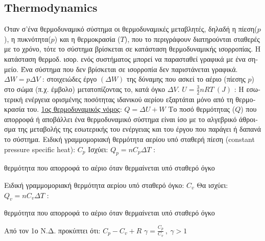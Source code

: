 \documentclass[12pt]{article}
\begin{document}
\begin{flushleft}
	\subsection{Thermodynamics} 
	
	\textbullet \quad \textgreek{Όταν σ'ένα θερμοδυναμικό σύστημα οι θερμοδυναμικές μεταβλητές, δηλαδή η πίεση}($p$), \textgreek{η πυκνότητα}($p$) \textgreek{και η θερμοκρασία} ($T$), \textgreek{που το περιγράφουν διατηρούνται σταθερές με το χρόνο, τότε το σύστημα βρίσκεται σε κατάσταση θερμοδυναμικής ισορροπίας. Η κατάσταση θερμοδ. ισορ. ενός συστήματος μπορεί να παρασταθεί γραφικά με ένα σημείο. Ένα σύστημα που δεν βρίσκεται σε ισορροπία δεν παριστάνεται γραφικά}. \linebreak 
	\textbullet \quad $\displaystyle \Delta W = p \Delta V$  :  \textgreek{στοιχειώδες έργο} $(\Delta W)$ \textgreek{της δύναμης που ασκεί το αέριο (πίεσης} $p$) \textgreek{στο σώμα (π.χ. έμβολο) μετατοπίζοντας το, κατά όγκο} $\Delta V$. \linebreak 
	\textbullet \quad $U = \frac{3}{2} nRT \ (J)$  :  \textgreek{Η εσωτερική ενέργεια ορισμένης ποσότητας ιδανικού αερίου εξαρτάται μόνο από τη θερμοκρασία του}. \linebreak 
	\textbullet \quad \uline{\textgreek{1ος θερμοδυναμικός νόμος}}: $\displaystyle Q = \Delta U + W$ \linebreak 
	\textgreek{Το ποσό θερμότητας} ($Q$) \textgreek{που απορροφά ή αποβάλλει ένα θερμοδυναμικό σύστημα είναι ίσο με το αλγεβρικό άθροισμα της μεταβολής της εσωτερικής του ενέργειας και του έργου που παράγει ή δαπανά το σύστημα}. \linebreak 
	\textbullet \quad \textgreek{Ειδική γραμμομοριακή θερμότητα αερίου υπό σταθερή πίεση} (constant pressure specific heat): $C_p$ \linebreak 
	\textgreek{Ισχύει:} $\displaystyle Q_p = n C_p \Delta T$  :  
	\begin{small}
	\textgreek{θερμότητα που απορροφά το αέριο όταν θερμαίνεται υπό σταθερό όγκο}
	\end{small} \linebreak 
	\textbullet \quad \textgreek{Ειδική γραμμομοριακή θερμότητα αερίου υπό σταθερό όγκο:} $C_v$ \linebreak 
	\textgreek{Θα ισχύει}: $\displaystyle Q_v = n C_v \Delta T$  :  \begin{small}
	\textgreek{θερμότητα που απορροφά το αέριο όταν θερμαίνεται υπό σταθερό όγκο}
	\end{small} \linebreak 
	\textbullet \quad \textgreek{Από τον 1ο Ν.Δ. προκύπτει ότι:} $\displaystyle C_p - C_v + R$ \linebreak 
	\textbullet \quad $\displaystyle \gamma = \frac{C_p}{C_v} \ , \ \gamma > 1$ \linebreak 
	

\end{flushleft}
\end{document}
